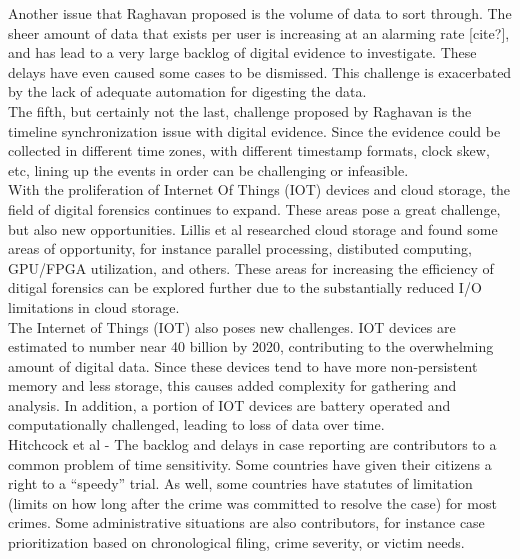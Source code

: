 \documentclass[12pt]{article}
\begin{document}
Another issue that Raghavan\cite{raghavan2013digital} proposed is the volume of data to sort through.  The sheer
amount of data that exists per user is increasing at an alarming rate [cite?], and has lead to a very large
backlog of digital evidence to investigate.  These delays have even caused some cases to be dismissed.  This
challenge is exacerbated by the lack of adequate automation for digesting the data.\\

The fifth, but certainly not the last, challenge proposed by Raghavan\cite{raghavan2013digital} is the timeline
synchronization issue with digital evidence.  Since the evidence could be collected in different time zones, 
with different timestamp formats, clock skew, etc, lining up the events in order can be challenging or
infeasible.\\

With the proliferation of Internet Of Things (IOT) devices and cloud storage, the field of digital forensics
continues to expand.  These areas pose a great challenge, but also new opportunities.  Lillis et
al\cite{lillis2016current} researched cloud storage and found some areas of opportunity, for instance parallel
processing, distibuted computing, GPU/FPGA utilization, and others.  These areas for increasing the efficiency
of ditigal forensics can be explored further due to the substantially reduced I/O limitations in cloud storage.\\

The Internet of Things (IOT) also poses new challenges.  IOT devices are estimated to number near 40 billion by
2020, contributing to the overwhelming amount of digital data.  Since these devices tend to have more 
non-persistent memory and less storage, this causes added complexity for gathering and analysis.  In addition,
a portion of IOT devices are battery operated and computationally challenged, leading to loss of data over
time.\\

Hitchcock et al\cite{hitchcock2016tiered} - The backlog and delays in case reporting are contributors to a common problem of time sensitivity.  Some countries 
have given their citizens a right to a ``speedy'' trial.  As well, some countries have statutes of limitation (limits
on how long after the crime was committed to resolve the case) for most crimes.  Some administrative situations are
also contributors, for instance case prioritization based on chronological filing, crime severity, or victim needs.\\
\end{document}

